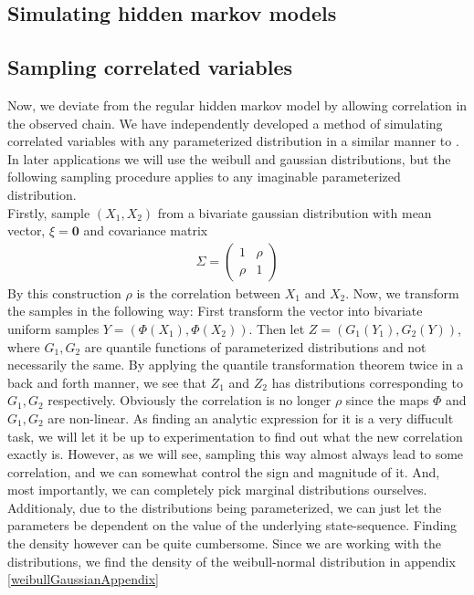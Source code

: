 \subsection{Simulating hidden markov models}

\subsection{Sampling correlated variables}\label{correlatedVariables}
Now, we deviate from the regular hidden markov model by allowing correlation in the observed chain. We have independently developed a method of simulating correlated variables with any parameterized distribution in a similar manner to \cite{thomasWard}. In later applications we will use the weibull and gaussian distributions, but the following sampling procedure applies to any imaginable parameterized distribution.\\ Firstly, sample $(X_1, X_2)$ from a bivariate gaussian distribution with mean vector, $\xi = \mathbf{0}$ and covariance matrix 
\begin{align}\Sigma = \begin{pmatrix}
    1 & \rho \\
    \rho & 1
\end{pmatrix}
\end{align}
By this construction $\rho$ is the correlation between $X_1$ and $X_2$. Now, we transform the samples in the following way: First transform the vector into bivariate uniform samples $Y = (\Phi(X_1),\Phi(X_2))$. Then let $Z = (G_1(Y_1), G_2(Y))$, where $G_1, G_2$ are quantile functions of parameterized distributions and not necessarily the same. By applying the quantile transformation theorem twice in a back and forth manner, we see that $Z_1$ and $Z_2$ has distributions corresponding to $G_1, G_2$ respectively. Obviously the correlation is no longer $\rho$ since the maps $\Phi$ and $G_1, G_2$ are non-linear. As finding an analytic expression for it is a very diffucult task, we will let it be up to experimentation to find out what the new correlation exactly is. However, as we will see, sampling this way almost always lead to some correlation, and we can somewhat control the sign and magnitude of it. And, most importantly, we can completely pick marginal distributions ourselves. Additionaly, due to the distributions being parameterized, we can just let the parameters be dependent on the value of the underlying state-sequence. Finding the density however can be quite cumbersome. Since we are working with the distributions, we find the density of the weibull-normal distribution in appendix \ref{weibullGaussianAppendix}